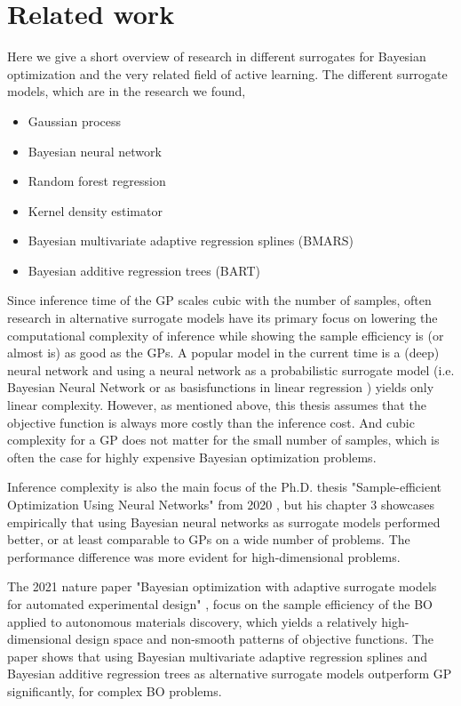 \section{Related work}
Here we give a short overview of research in different surrogates for Bayesian optimization
and the very related field of active learning. The different surrogate models, which are in the 
research we found, 
\begin{itemize}[noitemsep]
    \item Gaussian process
    \item Bayesian neural network
    \item Random forest regression
    \item Kernel density estimator
    \item Bayesian multivariate adaptive regression splines (BMARS)
    \item Bayesian additive regression trees (BART)
\end{itemize}

Since inference time of the GP scales cubic with the number of samples, often research in
alternative surrogate models have its primary focus on lowering the computational complexity of
inference while showing the sample efficiency is (or almost is) as good as the GPs. A popular model
in the current time is a (deep) neural network and using a neural network as a probabilistic
surrogate model (i.e. Bayesian Neural Network \cite{BOHAMIANN} or as basisfunctions in linear
regression \cite{DNGO}) yields only linear complexity. However, as mentioned above, this thesis
assumes that the objective function is always more costly than the inference cost. And cubic
complexity for a GP does not matter for the small number of samples, which is often the case for
highly expensive Bayesian optimization problems. 

Inference complexity is also the main focus of the Ph.D. thesis "Sample-efficient Optimization Using
Neural Networks" from 2020 \cite{PhDthesis}, but his chapter 3 showcases empirically that using Bayesian
neural networks as surrogate models performed better, or at least comparable to GPs on a wide number
of problems. The performance difference was more evident for high-dimensional problems.

The 2021 nature paper "Bayesian optimization with adaptive surrogate models for automated experimental design"
\cite{Nature_BO_paper}, focus on the sample efficiency of the BO applied to autonomous materials discovery, 
which yields a relatively high-dimensional design space and non-smooth patterns of objective functions.  
The paper shows that using Bayesian multivariate adaptive regression splines
and Bayesian additive regression trees as alternative surrogate models outperform GP significantly, 
for complex BO problems. 

